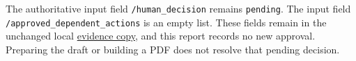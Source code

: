 \documentclass[lang=en,bibend=bibtex,a4paper,11pt]{elegantpaper}
\begin{document}
The authoritative input field \texttt{/human\_decision} remains \texttt{pending}.
The input field \texttt{/approved\_dependent\_actions} is an empty list.
These fields remain in the unchanged local \href{run:evidence.json}{evidence copy}, and this report records no new approval.
Preparing the draft or building a PDF does not resolve that pending decision.
\end{document}
